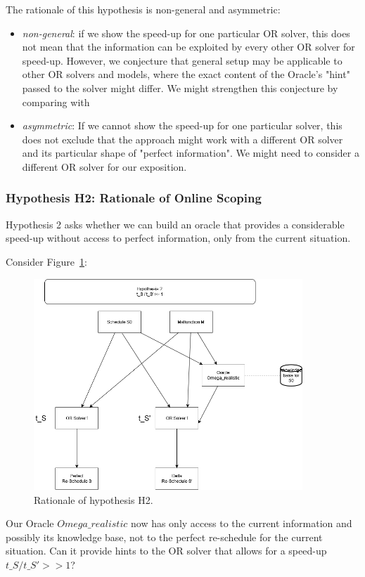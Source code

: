 \documentclass{article}
\begin{document}
The rationale of this hypothesis is non-general and asymmetric:
%
\begin{itemize}
    \item
    \emph{non-general}: if we show the speed-up for one particular OR solver, this does not mean that the information can be exploited by every other OR solver for speed-up. However, we conjecture that general setup may be applicable to other OR solvers and models, where the exact content of the Oracle's "hint" passed to the solver might differ. We might strengthen this conjecture by comparing with
\item
    \emph{asymmetric}: If we cannot show the speed-up for one particular solver, this does not exclude that the approach might work with a different OR solver and its particular shape of "perfect information". We might need to consider a different OR solver for our exposition.
\end{itemize}



\subsubsection{Hypothesis H2: Rationale of Online Scoping}\label{subec:H2}
Hypothesis 2 asks whether we can build an oracle that provides a considerable speed-up without access to perfect information, only from the current situation.

Consider Figure~\ref{fig:introduction_H2}:
%
\begin{figure}[hbtp]
	\centering
  \includegraphics[width=0.9\textwidth]{introduction_H2.png}
	\caption{Rationale of hypothesis H2.}
	\label{fig:introduction_H2}
\end{figure}
%
Our Oracle $Omega\_realistic$ now has only access to the current information and possibly its knowledge base, not to the perfect re-schedule for the current situation. Can it provide hints to the OR solver that allows for a speed-up $t\_S / t\_S' >> 1$?
\end{document}
